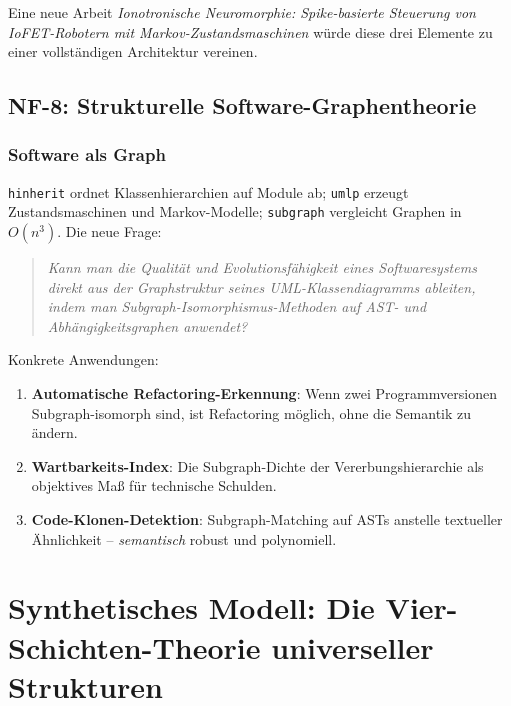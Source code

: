 ﻿\documentclass[a4paper,12pt]{scrreprt}
\theoremstyle{definition}
\begin{document}
Eine neue Arbeit \emph{Ionotronische Neuromorphie: Spike-basierte Steuerung
von IoFET-Robotern mit Markov-Zustandsmaschinen} würde diese drei Elemente
zu einer vollständigen Architektur vereinen.

\subsection{NF-8: Strukturelle Software-Graphentheorie}

\subsubsection{Software als Graph}

\texttt{hinherit} ordnet Klassenhierarchien auf Module ab;
\texttt{umlp} erzeugt Zustandsmaschi\-nen und Markov-Modelle;
\texttt{subgraph} vergleicht Graphen in $O(n^3)$. Die neue Frage:

\begin{quote}
  \itshape
  Kann man die Qualität und Evolutionsfähigkeit eines Softwaresystems
  direkt aus der Graphstruktur seines UML-Klassendiagramms ableiten,
  indem man Subgraph-Isomorphismus-Methoden auf AST- und
  Abhängigkeitsgraphen anwendet?
\end{quote}

Konkrete Anwendungen:
\begin{enumerate}
  \item \textbf{Automatische Refactoring-Erkennung}: Wenn zwei
    Programmversionen Subgraph-isomorph sind, ist Refactoring möglich,
    ohne die Semantik zu ändern.
  \item \textbf{Wartbarkeits-Index}: Die Subgraph-Dichte der Vererbungshierarchie
    als objektives Maß für technische Schulden.
  \item \textbf{Code-Klonen-Detektion}: Subgraph-Matching auf ASTs anstelle
    textueller Ähnlichkeit -- \emph{semantisch} robust und polynomiell.
\end{enumerate}

\section{Synthetisches Modell: Die Vier-Schichten-Theorie
  universeller Strukturen}
\label{sec:vier_schichten}
\end{document}
